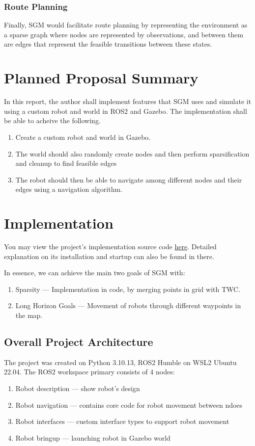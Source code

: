 \documentclass[conference]{IEEEtran}
\begin{document}
\subsubsection{Route Planning}
Finally, SGM would facilitate route planning by representing the environment as a sparse graph where nodes are represented by observations, and between them are edges that represent the feasible transitions between these states.


\section{Planned Proposal Summary}

In this report, the author shall implement features that SGM uses and simulate it using a custom robot and world in ROS2 and Gazebo.
The implementation shall be able to acheive the following.
\begin{enumerate}
  \item Create a custom robot and world in Gazebo.
  \item The world should also randomly create nodes and then perform sparsification and cleanup to find feasible edges
  \item The robot should then be able to navigate among different nodes and their edges using a navigation algorithm.
\end{enumerate}

\section{Implementation}
You may view the project's implementation source code \href{https://github.com/demeritbird/Sparse-Graphical-Memory-Robot-Planning}{here}. Detailed explanation on its installation and startup can also be found in there.

In essence, we can achieve the main two goals of SGM with:
\begin{enumerate}
  \item Sparsity --- Implementation in code, by merging points in grid with TWC.
  \item Long Horizon Goals --- Movement of robots through different waypoints in the map.
\end{enumerate}

\subsection{Overall Project Architecture}
The project was created on Python 3.10.13, ROS2 Humble on WSL2 Ubuntu 22.04.
The ROS2 workspace primary consists of 4 nodes:
\begin{enumerate}
  \item Robot description --- show robot's design
  \item Robot navigation --- contains core code for robot movement between ndoes
  \item Robot interfaces --- custom interface types to support robot movement
  \item Robot bringup --- launching robot in Gazebo world
\end{enumerate}
\end{document}
